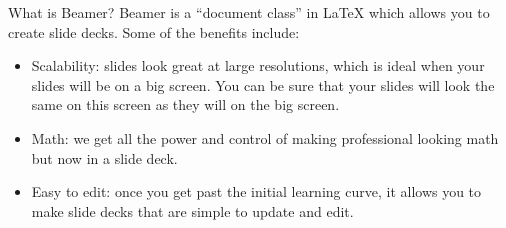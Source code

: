 \documentclass{beamer}
\begin{document}
\begin{frame}{What is Beamer?} %
    Beamer is a ``document class'' in LaTeX which allows you to create slide decks. 
    Some of the benefits include:
    
    \begin{itemize}
        \pause %
        \item Scalability: slides look great at large resolutions, which is ideal when your slides will be on a big screen.
        You can be sure that your slides will look the same on this screen as they will on the big screen.
        \pause
        \item Math: we get all the power and control of making professional looking math but now in a slide deck.
        \pause
        \item Easy to edit: once you get past the initial learning curve, it allows you to make slide decks that are simple to update and edit.
    \end{itemize}

\end{frame}

\end{document}
